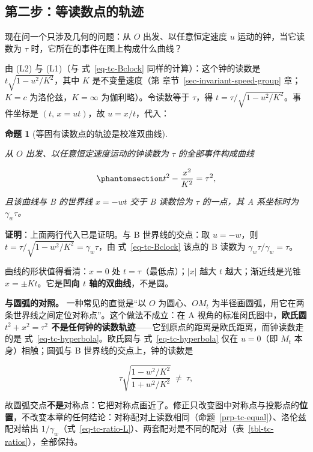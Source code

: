 \documentclass[
  chinese,
  a4paper,
  UTF8,
  12pt,
  oneside,
  openany]{ctexbook}
\theoremstyle{plain}
\theoremstyle{plain}
\theoremstyle{plain}
\newtheorem{proposition}{命题}[chapter]
\theoremstyle{definition}
\theoremstyle{plain}
\theoremstyle{plain}
\theoremstyle{remark}
\begin{document}
\subsection{第二步：等读数点的轨迹}\label{ux7b2cux4e8cux6b65ux7b49ux8bfbux6570ux70b9ux7684ux8f68ux8ff9}

现在问一个只涉及几何的问题：从 \(O\) 出发、以任意恒定速度 \(u\)
运动的钟，当它读数为 \(\tau\) 时，它所在的事件在图上构成什么曲线？

由 (L2) 与 (L1)（与 式~\ref{eq-tc-Bclock} 同样的计算）：这个钟的读数是
\(t\sqrt{1-u^{2}/K^{2}}\)，其中 \(K\) 是不变量速度（第
章节~\ref{sec-invariant-speed-group} 章；\(K=c\) 为洛伦兹，\(K=\infty\)
为伽利略）。令读数等于 \(\tau\)，得
\(t=\tau\big/\sqrt{1-u^{2}/K^{2}}\)。事件坐标是 \((t,\,x=ut)\)，故
\(u=x/t\)，代入：

\begin{proposition}[等固有读数点的轨迹是校准双曲线]\protect\hypertarget{prp-tc-hyperbola}{}\label{prp-tc-hyperbola}

从 \(O\) 出发、以任意恒定速度运动的钟读数为 \(\tau\) 的全部事件构成曲线

\begin{equation}\protect\phantomsection\label{eq-tc-hyperbola}{
t^{2}-\frac{x^{2}}{K^{2}}=\tau^{2},
}\end{equation}

且该曲线与 B 的世界线 \(x=-wt\) 交于 B 读数恰为 \(\tau\) 的一点，其 A
系坐标时为 \(\gamma_w\tau\)。

\end{proposition}

\textbf{证明}：上面两行代入已是证明。与 B 世界线的交点：取 \(u=-w\)，则
\(t=\tau\big/\sqrt{1-w^{2}/K^{2}}=\gamma_w\tau\)，由
式~\ref{eq-tc-Bclock} 该点的 B 读数为 \(\gamma_w\tau/\gamma_w=\tau\)。

曲线的形状值得看清：\(x=0\) 处 \(t=\tau\)（最低点）；\(|x|\) 越大 \(t\)
越大；渐近线是光锥 \(x=\pm Kt\)。它是\textbf{凹向 \(t\)
轴的双曲线}，不是圆。

\textbf{与圆弧的对照。} 一种常见的直觉是``以 \(O\) 为圆心、\(OM_t\)
为半径画圆弧，用它在两条世界线之间定位对称点''。这个做法不成立：在 A
视角的标准闵氏图中，\textbf{欧氏圆 \(t^{2}+x^{2}=\tau^{2}\)
不是任何钟的读数轨迹}------它到原点的距离是欧氏距离，而钟读数走的是
式~\ref{eq-tc-hyperbola}。欧氏圆与 式~\ref{eq-tc-hyperbola} 仅在
\(u=0\)（即 \(M_t\) 本身）相触；圆弧与 B 世界线的交点上，钟的读数是

\[
\tau\sqrt{\frac{1-w^{2}/K^{2}}{1+w^{2}/K^{2}}}\ \neq\ \tau,
\]

故圆弧交点\textbf{不是}对称点：它把对称点画近了。修正只改变图中对称点与投影点的\textbf{位置}，不改变本章的任何结论：对称配对上读数相同（命题~\ref{prp-tc-equal}）、洛伦兹配对给出
\(1/\gamma_w\)（式~\ref{eq-tc-ratio-L}）、两套配对是不同的配对（表~\ref{tbl-tc-ratios}），全部保持。
\end{document}
